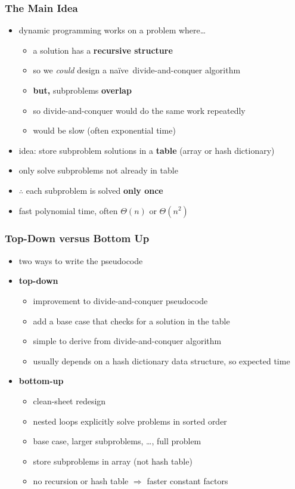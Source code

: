 \documentclass{beamer}
\newcommand{\naive}{na\"{i}ve~}
\begin{document}
\begin{frame} \frametitle{The Main Idea}
  \begin{itemize}
    \item dynamic programming works on a problem where\dots
    \begin{itemize}
      \item a solution has a \textbf{recursive structure}
      \item so we \emph{could} design a \naive divide-and-conquer algorithm
      \item \textbf{but,} subproblems \textbf{overlap}
      \item so divide-and-conquer would do the same work repeatedly
      \item would be slow (often exponential time)
    \end{itemize}
    \item idea: store subproblem solutions in a \textbf{table} (array or hash dictionary)
    \item only solve subproblems not already in table
    \item $\therefore$ each subproblem is solved \textbf{only once}
    \item fast polynomial time, often $\Theta(n)$ or $\Theta(n^2)$
  \end{itemize}
\end{frame}

\begin{frame} \frametitle{Top-Down versus Bottom Up}
  \begin{itemize}
    \item two ways to write the pseudocode
    \item \textbf{top-down}
    \begin{itemize}
      \item improvement to divide-and-conquer pseudocode
      \item add a base case that checks for a solution in the table
      \item simple to derive from divide-and-conquer algorithm
      \item usually depends on a hash dictionary data structure, so expected time
    \end{itemize}
    \item \textbf{bottom-up}
    \begin{itemize}
      \item clean-sheet redesign
      \item nested loops explicitly solve problems in sorted order
      \item base case, larger subproblems, \dots, full problem
      \item store subproblems in array (not hash table)
      \item no recursion or hash table $\Rightarrow$ faster constant factors
    \end{itemize}
  \end{itemize}
\end{frame}
\end{document}

